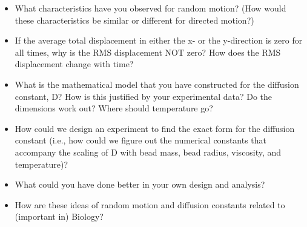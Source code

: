 \begin{enumerate}
\begin{itemize}
\item What characteristics have you observed for random motion? (How would these characteristics be similar or different for directed motion?)
\item If the average total displacement in either the x- or the y-direction is zero for all times, why is the RMS displacement NOT zero? How does the RMS displacement change with time?
\item What is the mathematical model that you have constructed for the diffusion constant, D? How is this justified by your experimental data? Do the dimensions work out? Where should temperature go?
\item How could we design an experiment to find the exact form for the diffusion constant (i.e., how could we figure out the numerical constants that accompany the scaling of D with bead mass, bead radius, viscosity, and temperature)?
\item What could you have done better in your own design and analysis?
\item How are these ideas of random motion and diffusion constants related to (important in) Biology?
\end{itemize}
\end{enumerate}

